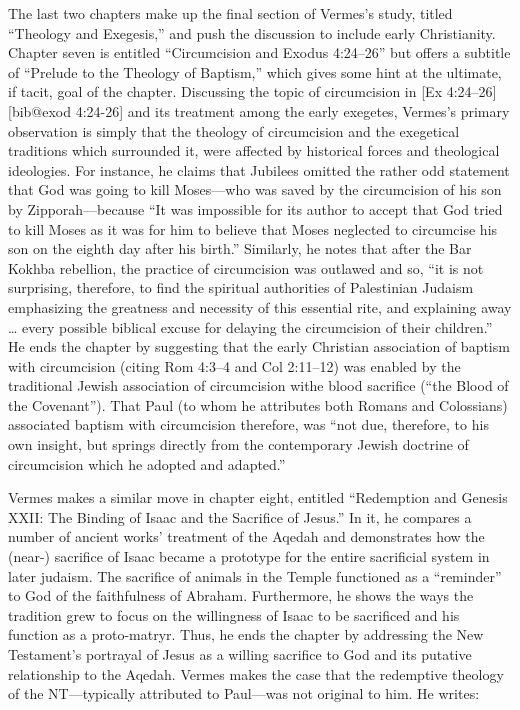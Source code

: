 The last two chapters make up the final section of Vermes's study,
titled ``Theology and Exegesis,'' and push the discussion to include
early Christianity. Chapter seven is entitled ``Circumcision and Exodus
4:24--26'' but offers a subtitle of ``Prelude to the Theology of
Baptism,'' which gives some hint at the ultimate, if tacit, goal of the
chapter. Discussing the topic of circumcision in {[}Ex
4:24--26{]}{[}bib@exod 4:24-26{]} and its treatment among the early
exegetes, Vermes's primary observation is simply that the theology of
circumcision and the exegetical traditions which surrounded it, were
affected by historical forces and theological ideologies. For instance,
he claims that Jubilees omitted the rather odd statement that God was
going to kill Moses---who was saved by the circumcision of his son by
Zipporah---because ``It was impossible for its author to accept that God
tried to kill Moses as it was for him to believe that Moses neglected to
circumcise his son on the eighth day after his
birth.''\autocite[185]{vermes1961} Similarly, he notes that after the
Bar Kokhba rebellion, the practice of circumcision was outlawed and so,
``it is not surprising, therefore, to find the spiritual authorities of
Palestinian Judaism emphasizing the greatness and necessity of this
essential rite, and explaining away \ldots{} every possible biblical
excuse for delaying the circumcision of their
children.''\autocite[189]{vermes1961} He ends the chapter by suggesting
that the early Christian association of baptism with circumcision
(citing Rom 4:3--4 and Col 2:11--12) was enabled by the traditional
Jewish association of circumcision withe blood sacrifice (``the Blood of
the Covenant'')\autocite[190]{vermes1961}. That Paul (to whom he
attributes both Romans and Colossians) associated baptism with
circumcision therefore, was ``not due, therefore, to his own insight,
but springs directly from the contemporary Jewish doctrine of
circumcision which he adopted and adapted.''\autocite[191]{vermes1961}

Vermes makes a similar move in chapter eight, entitled ``Redemption and
Genesis XXII: The Binding of Isaac and the Sacrifice of Jesus.'' In it,
he compares a number of ancient works' treatment of the Aqedah and
demonstrates how the (near-) sacrifice of Isaac became a prototype for
the entire sacrificial system in later judaism. The sacrifice of animals
in the Temple functioned as a ``reminder'' to God of the faithfulness of
Abraham. Furthermore, he shows the ways the tradition grew to focus on
the willingness of Isaac to be sacrificed and his function as a
proto-matryr. Thus, he ends the chapter by addressing the New
Testament's portrayal of Jesus as a willing sacrifice to God and its
putative relationship to the Aqedah. Vermes makes the case that the
redemptive theology of the NT---typically attributed to Paul---was not
original to him. He writes:

